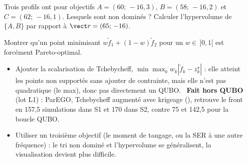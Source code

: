 \exercices
\begin{exercice}
Trois profils ont pour objectifs $A=(60;\,-16{,}3)$, $B=(58;\,-16{,}2)$ et $C=(62;\,-16{,}1)$. Lesquels sont non dominés ? Calculer l'hypervolume de $\{A,B\}$ par rapport à $\vect r=(65;\,-16)$.
\end{exercice}
\begin{exercice}
Montrer qu'un point minimisant $w\tilde f_1+(1-w)\tilde f_2$ pour un $w\in\,]0,1[$ est forcément Pareto-optimal.
\end{exercice}

\begin{pistes}
\begin{itemize}
\item Ajouter la scalarisation de Tchebycheff, $\min\max_k w_k|\tilde f_k-z_k^\star|$ : elle atteint les points non supportés sans ajouter de contrainte, mais elle n'est pas quadratique (le max), donc pas directement un QUBO. ~\textbf{Fait hors QUBO} (lot L1) : ParEGO, Tchebycheff augmenté avec krigeage (), retrouve le front en 157,5 simulations dans S1 et 170 dans S2, contre 75 et 142,5 pour la boucle QUBO.
\item Utiliser un troisième objectif (le moment de tangage, ou la SER à une autre fréquence) : le tri non dominé et l'hypervolume se généralisent, la visualisation devient plus difficile.
\end{itemize}
\end{pistes}
